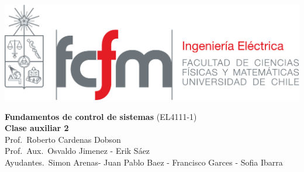\documentclass[
  11pt,
  letterpaper,
   addpoints,
  ]{exam}
\begin{document}
\noindent
\begin{minipage}{0.47\textwidth}
\includegraphics[width=\textwidth]{../fcfm_die}
\end{minipage}
\begin{minipage}{0.53\textwidth}
\begin{center} 
\large\textbf{Fundamentos de control de sistemas} (EL4111-1) \\
\large\textbf{Clase auxiliar 2} \\
\small Prof.~Roberto Cardenas Dobson\\
\small Prof.~Aux.~Osvaldo Jimenez - Erik Sáez\\
\small Ayudantes.~Simon Arenas- Juan Pablo Baez - Francisco Garces - Sofia Ibarra\\
\end{center}
\end{minipage}

\vspace{0.5cm}
\noindent
\vspace{.85cm}
\end{document}
